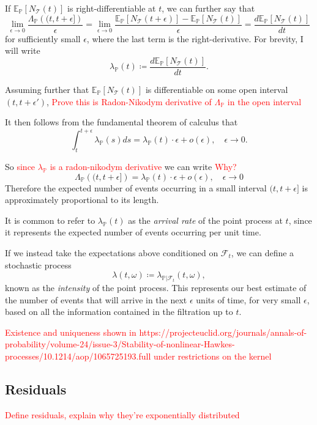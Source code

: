 \documentclass[honours,12pt]{unswthesis}
\numberwithin{equation}{section}
\begin{document}
If $\mathbb{E}_\mathbb{P}\left[N_\mathcal{T}(t)\right]$ is right-differentiable at $t$, we can further say that
$$\lim_{\epsilon\to0}\frac{\Lambda_\mathbb{P}\left((t,t+\epsilon]\right)}{\epsilon} = \lim_{\epsilon\to0}\frac{\mathbb{E}_\mathbb{P}\left[N_\mathcal{T}(t+\epsilon)\right] - \mathbb{E}_\mathbb{P}\left[N_\mathcal{T}(t)\right]}{\epsilon} = \frac{d\mathbb{E}_\mathbb{P}\left[N_\mathcal{T}(t)\right]}{dt}$$
for sufficiently small $\epsilon$, where the last term is the right-derivative. For brevity, I will write
$$\lambda_{\mathbb{P}}(t) \coloneq \frac{d\mathbb{E}_\mathbb{P}\left[N_\mathcal{T}(t)\right]}{dt}.$$

Assuming further that $\mathbb{E}_\mathbb{P}\left[N_\mathcal{T}(t)\right]$ is differentiable on some open interval $(t,t+\epsilon')$, \textcolor{red}{Prove this is Radon-Nikodym derivative of $\Lambda_\mathbb{P}$ in the open interval}

It then follows from the fundamental theorem of calculus that
$$\int_t^{t+\epsilon} \lambda_{\mathbb{P}}(s)ds = \lambda_{\mathbb{P}}(t)\cdot\epsilon + o(\epsilon),\quad \epsilon\to 0.$$

So \textcolor{red}{since $\lambda_\mathbb{P}$ is a radon-nikodym derivative} we can write \textcolor{red}{Why?}
$$\Lambda_{\mathbb{P}}\left((t,t+\epsilon]\right)=\lambda_{\mathbb{P}}(t)\cdot\epsilon+o(\epsilon),\quad \epsilon\to 0$$
Therefore the expected number of events occurring in a small interval $(t,t+\epsilon]$ is approximately proportional to its length.

It is common to refer to $\lambda_{\mathbb{P}}(t)$ as the \textit{arrival rate} of the point process at $t$, since it represents the expected number of events occurring per unit time.

If we instead take the expectations above conditioned on $\mathcal{F}_t$, we can define a stochastic process
$$\lambda(t,\omega) \coloneq \lambda_{\mathbb{P}\vert\mathcal{F}_t}(t,\omega),$$
known as the \textit{intensity} of the point process. This represents our best estimate of the number of events that will arrive in the next $\epsilon$ units of time, for very small $\epsilon$, based on all the information contained in the filtration up to $t$.

\textcolor{red}{Existence and uniqueness shown in https://projecteuclid.org/journals/annals-of-probability/volume-24/issue-3/Stability-of-nonlinear-Hawkes-processes/10.1214/aop/1065725193.full under restrictions on the kernel}

\subsection{Residuals}
\textcolor{red}{Define residuals, explain why they're exponentially distributed}
\end{document}
